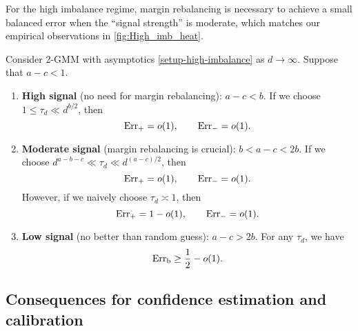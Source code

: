 For the high imbalance regime, margin rebalancing is necessary to achieve a small balanced error when the ``signal strength'' is moderate, which matches our empirical observations in \cref{fig:High_imb_heat}.

\begin{thm} \label{thm:high-imbalance}
Consider 2-GMM with asymptotics \cref{setup-high-imbalance} as $d \to \infty$. Suppose that $a - c < 1$.
\begin{enumerate}
\item \label{thm:high-imb_high}
\textbf{High signal} (no need for margin rebalancing): $a - c< b$. If we choose $1 \le \tau_d \ll d^{b/2}$, then 
\begin{equation*}
\mathrm{Err}_+ = o(1), \qquad \mathrm{Err}_- = o(1).
\end{equation*}
\item \label{thm:high-imb_moderate}
\textbf{Moderate signal} (margin rebalancing is crucial): $b < a - c < 2b$. If we choose $d^{a-b-c} \ll \tau_d \ll d^{(a-c)/2}$, then
\begin{equation*}
\mathrm{Err}_+ = o(1), \qquad \mathrm{Err}_- = o(1).
\end{equation*}
However, if we naively choose $\tau_d \asymp 1$, then 
\begin{equation*}
\mathrm{Err}_+ = 1 - o(1), \qquad \mathrm{Err}_- = o(1).
\end{equation*}
\item \label{thm:high-imb_low}
\textbf{Low signal} (no better than random guess): $a - c > 2b$. For any $\tau_d$, we have
\begin{equation*}
\mathrm{Err}_\mathrm{b} \ge \frac12 -  o(1).
\end{equation*}
\end{enumerate}
\end{thm}



\subsection{Consequences for confidence estimation and calibration}
\label{subsec:conf_calib}

